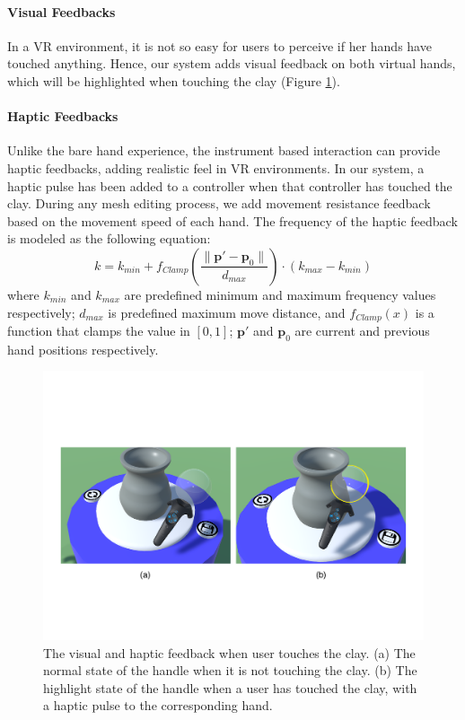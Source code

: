 \documentclass{svjour3}                     %
\begin{document}
\paragraph{Visual Feedbacks}
In a VR environment, it is not so easy for users to perceive if her hands have touched anything. Hence, our system adds visual feedback on both virtual hands, which will be highlighted when touching the clay (Figure \ref{fig:highlight}).

\paragraph{Haptic Feedbacks}
Unlike the bare hand experience, the instrument based interaction can provide haptic feedbacks, adding realistic feel in VR environments. In our system, a haptic pulse has been added to a controller when that controller has touched the clay. During any mesh editing process, we add movement resistance feedback based on the movement speed of each hand. The frequency of the haptic feedback is modeled as the following equation:
\begin{equation}
k = k_{min} + f_{Clamp}(\frac{ \| \mathbf{p'} - \mathbf{p}_{0} \|}{d_{max}}) \cdot (k_{max} - k_{min})
\end{equation}
where $k_{min}$ and $k_{max}$ are predefined minimum and maximum frequency values respectively; $d_{max}$ is predefined maximum move distance, and $f_{Clamp}(x)$ is a function that clamps the value in $[0,1]$; $\mathbf{p'}$ and $\mathbf{p}_{0}$ are current and previous hand positions respectively.

\begin{figure}
\includegraphics[width=\textwidth]{fig10}
\caption{The visual and haptic feedback when user touches the clay. (a) The normal state of the handle when it is not touching the clay. (b) The highlight state of the handle when a user has touched the clay, with a haptic pulse to the corresponding hand.}
\label{fig:highlight}
\end{figure}
\end{document}
